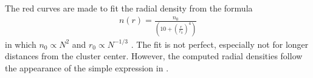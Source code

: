 The red curves are made to fit the radial density from the formula
\begin{align}
	n(r) = \frac{n_0}{\left( 1 0+ \left( \frac{r}{r_0} \right) ^4 \right)}
	\label{eq:radialDens}
	\end{align}
in which $n_0 \propto N^2$ and $r_0 \propto N^{-1/3}$
 \cite{ColdUniformSphericalCollapse}. 
The fit is not perfect, especially not for longer distances from the cluster center. 
However, the computed radial densities follow the appearance of the simple expression in .